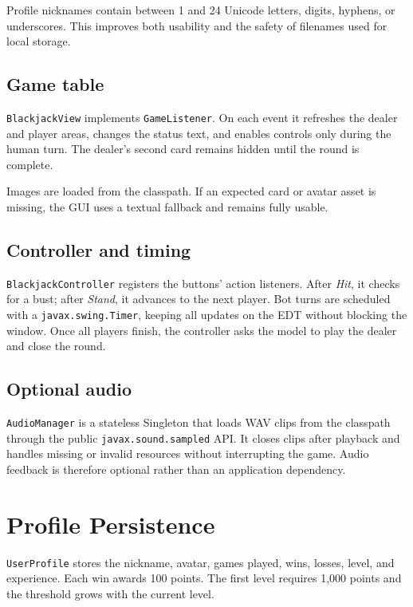 \documentclass[11pt,a4paper]{report}
\newcommand{\code}[1]{\nolinkurl{#1}}
\begin{document}
Profile nicknames contain between 1 and 24 Unicode letters, digits, hyphens, or
underscores. This improves both usability and the safety of filenames used for local
storage.

\section{Game table}

\code{BlackjackView} implements \code{GameListener}. On each event it refreshes the
dealer and player areas, changes the status text, and enables controls only during the
human turn. The dealer's second card remains hidden until the round is complete.

Images are loaded from the classpath. If an expected card or avatar asset is missing,
the GUI uses a textual fallback and remains fully usable.

\section{Controller and timing}

\code{BlackjackController} registers the buttons' action listeners. After \emph{Hit},
it checks for a bust; after \emph{Stand}, it advances to the next player. Bot turns are
scheduled with a \code{javax.swing.Timer}, keeping all updates on the EDT without
blocking the window. Once all players finish, the controller asks the model to play the
dealer and close the round.

\section{Optional audio}

\code{AudioManager} is a stateless Singleton that loads WAV clips from the classpath
through the public \code{javax.sound.sampled} API. It closes clips after playback and
handles missing or invalid resources without interrupting the game. Audio feedback is
therefore optional rather than an application dependency.

\chapter{Profile Persistence}

\code{UserProfile} stores the nickname, avatar, games played, wins, losses, level, and
experience. Each win awards 100 points. The first level requires 1,000 points and the
threshold grows with the current level.
\end{document}
